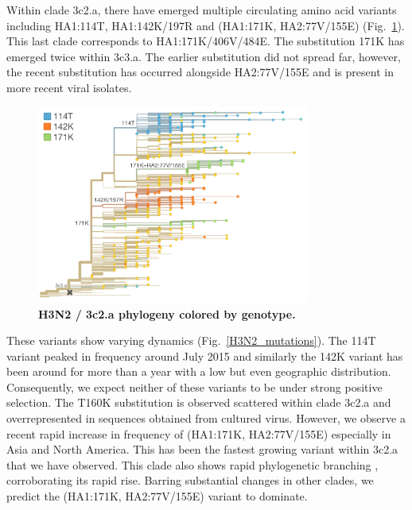 \documentclass[11pt,oneside,letterpaper]{article}
\begin{document}
Within clade 3c2.a, there have emerged multiple circulating amino acid variants including HA1:114T, HA1:142K/197R and (HA1:171K, HA2:77V/155E) (Fig.\ \ref{H3N2_3c2a_tree}). This last clade corresponds to HA1:171K/406V/484E. The substitution 171K has emerged twice within 3c3.a. The earlier substitution did not spread far, however, the recent substitution has occurred alongside HA2:77V/155E and is present in more recent viral isolates.

\begin{figure}[h!]
	\centering		
	\includegraphics[width=0.8\textwidth]{../figures/feb-2016/H3N2_3c2a_tree.png}
	\caption{\textbf{H3N2 / 3c2.a phylogeny colored by genotype.} 
	}
	\label{H3N2_3c2a_tree}
\end{figure}

These variants show varying dynamics (Fig.\ \ref{H3N2_mutations}). The 114T variant peaked in frequency around July 2015 and similarly the 142K variant has been around for more than a year with a low but even geographic distribution. Consequently, we expect neither of these variants to be under strong positive selection. The T160K substitution is observed scattered within clade 3c2.a and overrepresented in sequences obtained from cultured virus. However, we observe a recent rapid increase in frequency of (HA1:171K, HA2:77V/155E) especially in Asia and North America. This has been the fastest growing variant within 3c2.a that we have observed. This clade also shows rapid phylogenetic branching \cite{neher2014predicting}, corroborating its rapid rise. Barring substantial changes in other clades, we predict the (HA1:171K, HA2:77V/155E) variant to dominate.
\end{document}
